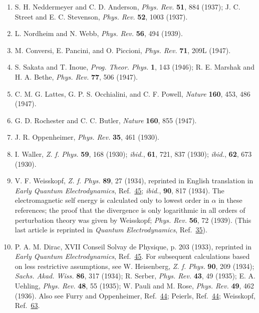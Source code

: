 \begin{enumerate}
\item\label{ref:1.56} S. H. Neddermeyer and C. D. Anderson, \emph{Phys. Rev.} \textbf{51},
884 (1937); J. C. Street and E. C. Stevenson, \emph{Phys. Rev.} \textbf{52},
1003 (1937).

\item[56a.]\label{ref:1.56a} L. Nordheim and N. Webb, \emph{Phys. Rev.} \textbf{56}, 494
(1939).

\item\label{ref:1.57} M. Conversi, E. Pancini, and O. Piccioni, \emph{Phys. Rev.} \textbf{71},
209L (1947).

\item\label{ref:1.58} S. Sakata and T. Inoue, \emph{Prog. Theor. Phys.} \textbf{1}, 143
(1946); R. E. Marshak and H. A. Bethe, \emph{Phys. Rev.} \textbf{77}, 506
(1947).

\item\label{ref:1.59} C. M. G. Lattes, G. P. S. Occhialini, and C. F. Powell, \emph{Nature}
\textbf{160}, 453, 486 (1947).

\item\label{ref:1.60} G. D. Rochester and C. C. Butler, \emph{Nature} \textbf{160}, 855
(1947).

\item\label{ref:1.61} J. R. Oppenheimer, \emph{Phys. Rev.} \textbf{35}, 461 (1930).

\item\label{ref:1.62} I. Waller, \emph{Z. f. Phys.} \textbf{59}, 168 (1930); \emph{ibid.},
\textbf{61}, 721, 837 (1930); \emph{ibid.}, \textbf{62}, 673 (1930).

\item\label{ref:1.63} V. F. Weisskopf, \emph{Z. f. Phys.} \textbf{89}, 27 (1934), reprinted
in English translation in \emph{Early Quantum Electrodynamics}, Ref.~\hyperref[ref:1.45]{45};
\emph{ibid.}, \textbf{90}, 817 (1934). The electromagnetic self energy is
calculated only to lowest order in $\alpha$ in these references; the proof that
the divergence is only logarithmic in all orders of perturbation theory was
given by Weisskopf; \emph{Phys. Rev.} \textbf{56}, 72 (1939). (This last
article is reprinted in \emph{Quantum Electrodynamics}, Ref.~\hyperref[ref:1.35]{35}).

\item\label{ref:1.64} P. A. M. Dirac, XVII Conseil Solvay de Physique, p. 203 (1933),
reprinted in \emph{Early Quantum Electrodynamics}, Ref.~\hyperref[ref:1.45]{45}. For subsequent
calculations based on less restrictive assumptions, see W. Heisenberg,
\emph{Z. f. Phys.} \textbf{90}, 209 (1934); \emph{Sachs. Akad. Wiss.}
\textbf{86}, 317 (1934); R. Serber, \emph{Phys. Rev.} \textbf{43}, 49 (1935);
E. A. Uehling, \emph{Phys. Rev.} \textbf{48}, 55 (1935); W. Pauli and M. Rose,
\emph{Phys. Rev.} \textbf{49}, 462 (1936). Also see Furry and Oppenheimer,
Ref.~\hyperref[ref:1.44]{44}; Peierls, Ref.~\hyperref[ref:1.44]{44}; Weisskopf, Ref.~\hyperref[ref:1.63]{63}.


\end{enumerate}
